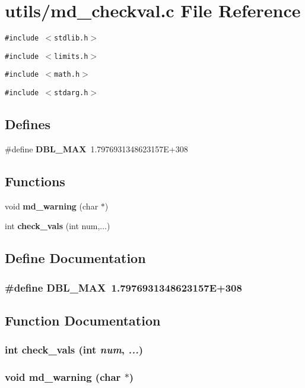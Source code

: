 \section{utils/md\_\-checkval.c File Reference}
\label{md__checkval_8c}
{\tt \#include $<$stdlib.h$>$}\par
{\tt \#include $<$limits.h$>$}\par
{\tt \#include $<$math.h$>$}\par
{\tt \#include $<$stdarg.h$>$}\par
\subsection*{Defines}
\begin{CompactItemize}
\item 
\#define {\bf DBL\_\-MAX}~1.7976931348623157E+308
\end{CompactItemize}
\subsection*{Functions}
\begin{CompactItemize}
\item 
void {\bf md\_\-warning} (char $\ast$)
\item 
int {\bf check\_\-vals} (int num,...)
\end{CompactItemize}


\subsection{Define Documentation}
\subsubsection{\setlength{\rightskip}{0pt plus 5cm}\#define DBL\_\-MAX~1.7976931348623157E+308}\label{md__checkval_8c_f78670ee54c1203d613f8fb0e022d214}




\subsection{Function Documentation}
\subsubsection{\setlength{\rightskip}{0pt plus 5cm}int check\_\-vals (int {\em num},  {\em ...})}\label{md__checkval_8c_675b2b90e446d05a689550df8efe6d9f}


\subsubsection{\setlength{\rightskip}{0pt plus 5cm}void md\_\-warning (char $\ast$)}\label{md__checkval_8c_6cfbb471612c01c843a61f674a13d612}


